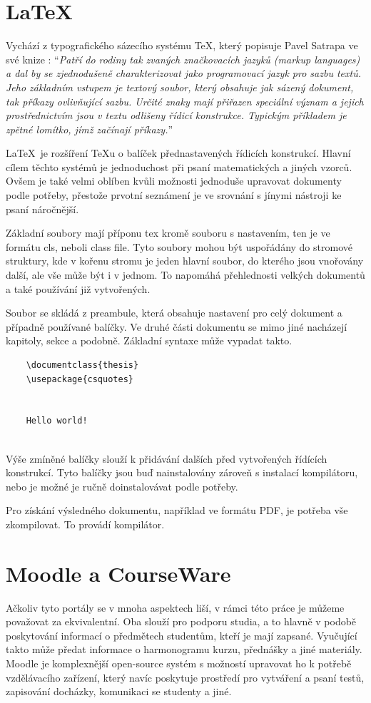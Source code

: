 \section{LaTeX} 
	Vychází z typografického sázecího systému \TeX, který popisuje Pavel Satrapa ve své knize \cite{latex}: \enquote{\textit{Patří do rodiny tak zvaných značkovacích jazyků (markup languages) a dal by se zjednodušeně charakterizovat jako programovací jazyk pro sazbu textů. Jeho základním vstupem je textový soubor, který obsahuje jak sázený dokument, tak příkazy ovlivňující sazbu. Určité znaky mají přiřazen speciální význam a jejich prostřednictvím jsou v textu odlišeny řídicí konstrukce. Typickým příkladem je zpětné lomítko, jímž začínají příkazy.}}
	
	\LaTeX\ je rozšíření \TeX u o balíček přednastavených řídicích konstrukcí. Hlavní cílem těchto systémů je jednoduchost při psaní matematických a jiných vzorců. Ovšem je také velmi oblíben kvůli možnosti jednoduše upravovat dokumenty podle potřeby, přestože prvotní seznámení je ve srovnání s jínymi nástroji ke psaní náročnější.
	
	Základní soubory mají příponu tex kromě souboru s nastavením, ten je ve formátu cls, neboli class file. Tyto soubory mohou být uspořádány do stromové struktury, kde v kořenu stromu je jeden hlavní soubor, do kterého jsou vnořovány další, ale vše může být i v jednom. To napomáhá přehlednosti velkých dokumentů a také používání již vytvořených. 
	
	Soubor se skládá z preambule, která obsahuje nastavení pro celý dokument a případně používané balíčky. Ve druhé části dokumentu se mimo jiné nacházejí kapitoly, sekce a podobně. Základní syntaxe může vypadat takto.
	\begin{verbatim}
	\documentclass{thesis}
	\usepackage{csquotes}
	
	
	Hello world!
	
	\end{verbatim}
	
	Výše zmíněné balíčky slouží k přidávání dalších před vytvořených řídících konstrukcí. Tyto balíčky jsou buď nainstalovány zároveň s instalací kompilátoru, nebo je možné je ručně doinstalovávat podle potřeby. 
	
	Pro získání výsledného dokumentu, například ve formátu PDF, je potřeba vše zkompilovat. To provádí kompilátor.  

\section{Moodle a CourseWare}
	Ačkoliv tyto portály se v mnoha aspektech liší, v rámci této práce je můžeme považovat za ekvivalentní. Oba slouží pro podporu studia, a to hlavně v podobě poskytování informací o předmětech studentům, kteří je mají zapsané. Vyučující takto může předat informace o harmonogramu kurzu, přednášky a jiné materiály. Moodle je komplexnější open-source systém s možností upravovat ho k potřebě vzdělávacího zařízení, který navíc poskytuje prostředí pro vytváření a psaní testů, zapisování docházky, komunikaci se studenty a jiné.

